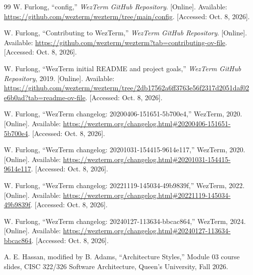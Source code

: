 \begin{thebibliography}{99}
W. Furlong, ``config,'' \emph{WezTerm GitHub Repository}.
[Online]. Available: \url{https://github.com/wezterm/wezterm/tree/main/config}.
[Accessed: Oct. 8, 2026].

W. Furlong, ``Contributing to WezTerm,'' \emph{WezTerm GitHub Repository}.
[Online]. Available: \url{https://github.com/wezterm/wezterm?tab=contributing-ov-file}.
[Accessed: Oct. 8, 2026].

W. Furlong, ``WezTerm initial README and project goals,'' \emph{WezTerm GitHub Repository}, 2019.
[Online]. Available: \url{https://github.com/wezterm/wezterm/tree/2db17562a6ff3763e56f2317d2051daf02e6b0ad?tab=readme-ov-file}.
[Accessed: Oct. 8, 2026].

W. Furlong, ``WezTerm changelog: 20200406-151651-5b700e4,'' WezTerm, 2020.
[Online]. Available: \url{https://wezterm.org/changelog.html\#20200406-151651-5b700e4}.
[Accessed: Oct. 8, 2026].

W. Furlong, ``WezTerm changelog: 20201031-154415-9614e117,'' WezTerm, 2020.
[Online]. Available: \url{https://wezterm.org/changelog.html\#20201031-154415-9614e117}.
[Accessed: Oct. 8, 2026].

W. Furlong, ``WezTerm changelog: 20221119-145034-49b9839f,'' WezTerm, 2022.
[Online]. Available: \url{https://wezterm.org/changelog.html\#20221119-145034-49b9839f}.
[Accessed: Oct. 8, 2026].

W. Furlong, ``WezTerm changelog: 20240127-113634-bbcac864,'' WezTerm, 2024.
[Online]. Available: \url{https://wezterm.org/changelog.html\#20240127-113634-bbcac864}.
[Accessed: Oct. 8, 2026].

A. E. Hassan, modified by B. Adams, ``Architecture Styles,'' Module 03 course slides, CISC 322/326 Software Architecture, Queen's University, Fall 2026.

\end{thebibliography}